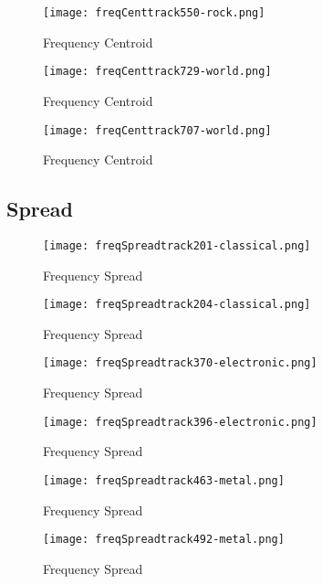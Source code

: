 \documentclass{article} %
\begin{document}
\begin{figure}[H]
\centering
\texttt{[image: freqCenttrack550-rock.png]}
\caption{Frequency Centroid}
\label{fig:cent550}
\end{figure}


\begin{figure}[H]
\centering
\texttt{[image: freqCenttrack729-world.png]}
\caption{Frequency Centroid}
\label{fig:cent729}
\end{figure}


\begin{figure}[H]
\centering
\texttt{[image: freqCenttrack707-world.png]}
\caption{Frequency Centroid}
\label{fig:cent707}
\end{figure}



\clearpage
\subsection{Spread}
\label{sec:spread}

\begin{figure}[H]
\centering
\texttt{[image: freqSpreadtrack201-classical.png]}
\caption{Frequency Spread}
\label{fig:spread201}
\end{figure}

\begin{figure}[H]
\centering
\texttt{[image: freqSpreadtrack204-classical.png]}
\caption{Frequency Spread}
\label{fig:spread204}
\end{figure}

\begin{figure}[H]
\centering
\texttt{[image: freqSpreadtrack370-electronic.png]}
\caption{Frequency Spread}
\label{fig:spread370}
\end{figure}


\begin{figure}[H]
\centering
\texttt{[image: freqSpreadtrack396-electronic.png]}
\caption{Frequency Spread}
\label{fig:spread396}
\end{figure}


\begin{figure}[H]
\centering
\texttt{[image: freqSpreadtrack463-metal.png]}
\caption{Frequency Spread}
\label{fig:spread463}
\end{figure}


\begin{figure}[H]
\centering
\texttt{[image: freqSpreadtrack492-metal.png]}
\caption{Frequency Spread}
\label{fig:spread492}
\end{figure}
\end{document}
